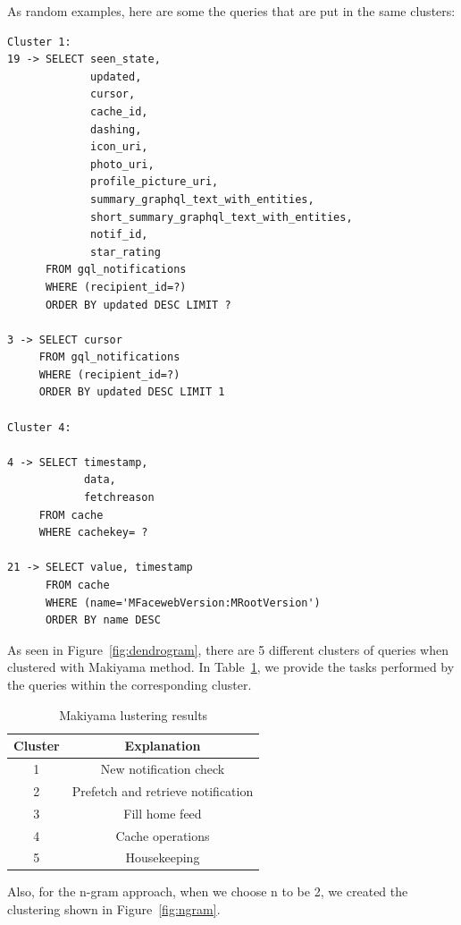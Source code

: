 As random examples, here are some the queries that are put in the same clusters:

\begin{verbatim}
Cluster 1:
19 -> SELECT seen_state,
             updated,
             cursor,
             cache_id,
             dashing,
             icon_uri,
             photo_uri,
             profile_picture_uri,
             summary_graphql_text_with_entities, 
             short_summary_graphql_text_with_entities,
             notif_id,
             star_rating
      FROM gql_notifications
      WHERE (recipient_id=?)
      ORDER BY updated DESC LIMIT ?

3 -> SELECT cursor
     FROM gql_notifications
     WHERE (recipient_id=?)
     ORDER BY updated DESC LIMIT 1

Cluster 4:

4 -> SELECT timestamp,
            data,
            fetchreason
     FROM cache
     WHERE cachekey= ?

21 -> SELECT value, timestamp
      FROM cache
      WHERE (name='MFacewebVersion:MRootVersion')
      ORDER BY name DESC

\end{verbatim}

As seen in Figure~\ref{fig:dendrogram}, there are 5 different clusters of queries when clustered with Makiyama method. In Table~\ref{tab:clusteringresult}, we provide the tasks performed by the queries within the corresponding cluster.

\begin{table}[h!]
\centering
\caption{Makiyama lustering results}
\label{tab:clusteringresult}
\begin{tabular}{|c|c|}
\hline
Cluster & Explanation                        \\ \hline
1       & New notification check             \\ \hline
2       & Prefetch and retrieve notification \\ \hline
3       & Fill home feed                     \\ \hline
4       & Cache operations                   \\ \hline
5       & Housekeeping                       \\ \hline
\end{tabular}
\end{table}


Also, for the n-gram approach, when we choose n to be 2, we created the clustering shown in Figure~\ref{fig:ngram}.

